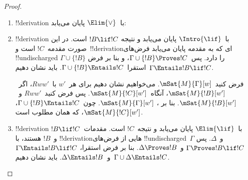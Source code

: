 \documentclass[../../../include/open-logic-section]{subfiles}
\begin{document}
\begin{proof}
\begin{enumerate}
  \item !!{derivation} با~$\Elim{\lor}$ پایان می‌یابد:

  \item !!{derivation} با~$\Intro{\lif}$ پایان می‌یابد و نتیجه
    $!B\lif !C$ است. در این صورت مقدمه~$!C$ است و~!!{derivation}ای که
    به مقدمه پایان می‌یابد فرض‌های !!{undischarged}
    $\Gamma \cup \{!B\}$ را دارد. پس~$\Gamma \cup \{!B\} \Proves !C$،
    و بنا بر فرض استقرا~$\Gamma \cup \{!B\} \Entails !C$. باید نشان
    دهیم~$\Gamma \Entails !B \lif !C$.

    فرض کنید~$\mSat{M}{\Gamma}[w]$. می‌خواهیم نشان دهیم برای هر~$w'$
    با~$Rww'$، اگر~$\mSat{M}{!B}[w']$، آنگاه~$\mSat{M}{!C}[w']$.
    پس فرض کنید~$Rww'$ و~$\mSat{M}{!B}[w']$. بنا بر
    ، $\mSat{M}{\Gamma}[w']$.
    چون~$\Gamma \cup \{!B\} \Entails !C$، $\mSat{M}{!C}[w']$، که
    همان مطلوب است.

  \item !!{derivation} با~$\Elim{\lif}$ پایان می‌یابد و نتیجه~$!C$
    است. مقدمات~$!B \lif !C$ و~$!B$ هستند، با !!{derivation}هایی از
    فرض‌های !!{undischarged}~$\Gamma$ و~$\Delta$. پس
    $\Gamma \Proves !B \lif !C$ و~$\Delta \Proves !B$. بنا بر فرض
    استقرا، $\Gamma \Entails !B \lif !C$ و~$\Delta \Entails !B$.
    باید نشان دهیم~$\Gamma \cup \Delta \Entails !C$.


\end{enumerate}
\end{proof}
\end{document}

